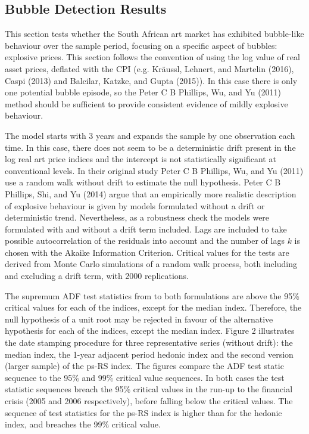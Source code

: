 \documentclass[]{elsarticle} %
\begin{document}
\subsection{Bubble Detection Results}\label{bubble-detection-results}

This section tests whether the South African art market has exhibited
bubble-like behaviour over the sample period, focusing on a specific
aspect of bubbles: explosive prices. This section follows the convention
of using the log value of real asset prices, deflated with the CPI (e.g.
Kräussl, Lehnert, and Martelin (2016), Caspi (2013) and Balcilar,
Katzke, and Gupta (2015)). In this case there is only one potential
bubble episode, so the Peter C B Phillips, Wu, and Yu (2011) method
should be sufficient to provide consistent evidence of mildly explosive
behaviour.

The model starts with 3 years and expands the sample by one observation
each time. In this case, there does not seem to be a deterministic drift
present in the log real art price indices and the intercept is not
statistically significant at conventional levels. In their original
study Peter C B Phillips, Wu, and Yu (2011) use a random walk without
drift to estimate the null hypothesis. Peter C B Phillips, Shi, and Yu
(2014) argue that an empirically more realistic description of explosive
behaviour is given by models formulated without a drift or deterministic
trend. Nevertheless, as a robustness check the models were formulated
with and without a drift term included. Lags are included to take
possible autocorrelation of the residuals into account and the number of
lags \(k\) is chosen with the Akaike Information Criterion. Critical
values for the tests are derived from Monte Carlo simulations of a
random walk process, both including and excluding a drift term, with
2000 replications.

The supremum ADF test statistics from to both formulations are above the
95\% critical values for each of the indices, except for the median
index. Therefore, the null hypothesis of a unit root may be rejected in
favour of the alternative hypothesis for each of the indices, except the
median index. Figure 2 illustrates the date stamping procedure for three
representative series (without drift): the median index, the 1-year
adjacent period hedonic index and the second version (larger sample) of
the ps-RS index. The figures compare the ADF test static sequence to the
95\% and 99\% critical value sequences. In both cases the test statistic
sequences breach the 95\% critical values in the run-up to the financial
crisis (2005 and 2006 respectively), before falling below the critical
values. The sequence of test statistics for the ps-RS index is higher
than for the hedonic index, and breaches the 99\% critical value.
\end{document}
